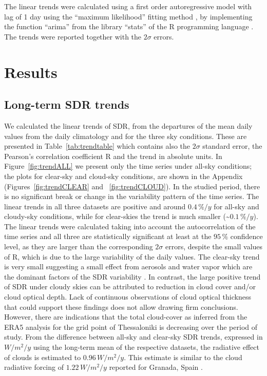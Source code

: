 \documentclass[applsci,article,submit,moreauthors,pdftex]{Definitions/mdpi}
\begin{document}
The linear trends were calculated using a first order autoregressive
model with lag of 1 day using the ``maximum likelihood'' fitting method
\citep{Gardner1980, Jones1980}, by implementing the function ``arima''
from the library ``stats'' of the R programming language
\citep{RCT2023}. The trends were reported together with the \(2\sigma\)
errors.

\hypertarget{results}{%
\section{Results}\label{results}}

\hypertarget{long-term-sdr-trends}{%
\subsection{Long-term SDR trends}\label{long-term-sdr-trends}}

We calculated the linear trends of SDR, from the departures of the mean
daily values from the daily climatology and for the three sky
conditions. These are presented in Table~\ref{tab:trendtable} which
contains also the \(2\sigma\) standard error, the Pearson's correlation
coefficient R and the trend in absolute units. In
Figure~\ref{fig:trendALL} we present only the time series under all-sky
conditions; the plots for clear-sky and cloud-sky conditions, are shown
in the Appendix (Figures~\ref{fig:trendCLEAR} and~
\ref{fig:trendCLOUD}). In the studied period, there is no significant
break or change in the variability pattern of the time series. The
linear trends in all three datasets are positive and around
\(0.4\,\%/y\) for all-sky and cloudy-sky conditions, while for
clear-skies the trend is much smaller (\textasciitilde{}\(0.1\,\%/y\)).
The linear trends were calculated taking into account the
autocorrelation of the time series and all three are statistically
significant at least at the \(95\,\%\) confidence level, as they are
larger than the corresponding \(2\sigma\) errors, despite the small
values of R, which is due to the large variability of the daily values.
The clear-sky trend is very small suggesting a small effect from
aerosols and water vapor which are the dominant factors of the SDR
variability \citep{Fountoulakis2016, Siomos2018, Yu2022}. In contrast,
the large positive trend of SDR under cloudy skies can be attributed to
reduction in cloud cover and/or cloud optical depth. Lack of continuous
observations of cloud optical thickness that could support these
findings does not allow drawing firm conclusions. However, there are
indications that the total cloud-cover as inferred from the ERA5
analysis for the grid point of Thessaloniki is decreasing over the
period of study. From the difference between all-sky and clear-sky SDR
trends, expressed in \(W/m^2/y\) using the long-term mean of the
respective datasets, the radiative effect of clouds is estimated to
\(0.96\,W/m^2/y\). This estimate is similar to the cloud radiative
forcing of \(1.22\,W/m^2/y\) reported for Granada, Spain
\citep{Lozano2023}.
\end{document}
